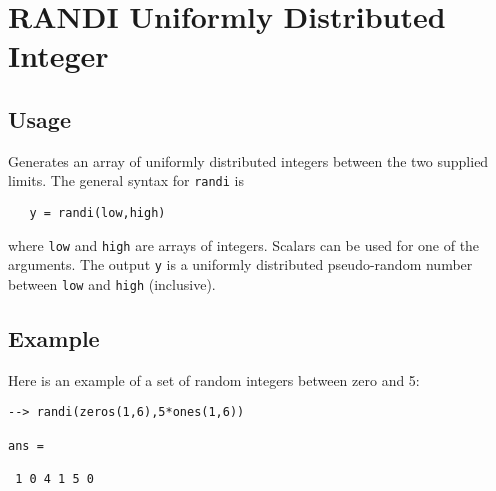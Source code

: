 \section{RANDI Uniformly Distributed Integer}

\subsection{Usage}

Generates an array of uniformly distributed integers between
the two supplied limits.  The general syntax for \verb|randi| is
\begin{verbatim}
   y = randi(low,high)
\end{verbatim}
where \verb|low| and \verb|high| are arrays of integers.  Scalars
can be used for one of the arguments.  The output \verb|y| is
a uniformly distributed pseudo-random number between \verb|low|
and \verb|high| (inclusive).
\subsection{Example}

Here is an example of a set of random integers between 
zero and 5:
\begin{verbatim}
--> randi(zeros(1,6),5*ones(1,6))

ans = 

 1 0 4 1 5 0 
\end{verbatim}
